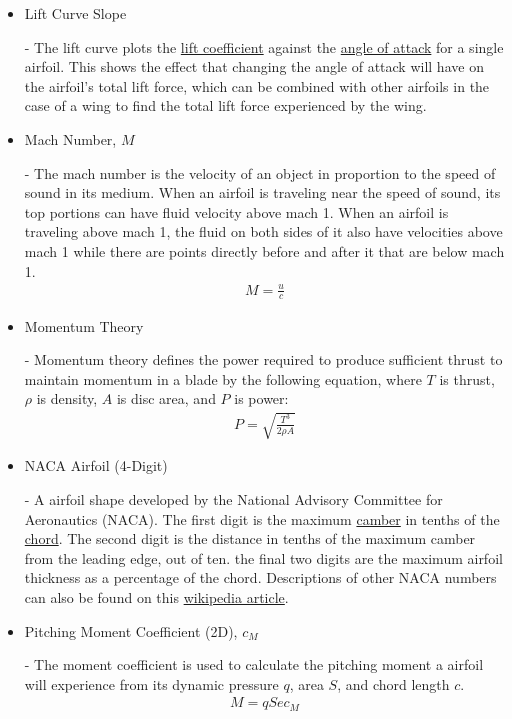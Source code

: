 \documentclass{article}
\begin{document}
\begin{itemize}
	\item \hypertarget{LC}{Lift Curve Slope} - The lift curve plots the \hyperlink{CL}{lift coefficient} against the \hyperlink{alpha}{angle of attack} for a single airfoil. This shows the effect that changing the angle of attack will have on the airfoil's total lift force, which can be combined with other airfoils in the case of a wing to find the total lift force experienced by the wing.
		
	\item \hypertarget{M}{Mach Number, $M$} - The mach number is the velocity of an object in proportion to the speed of sound in its medium. When an airfoil is traveling near the speed of sound, its top portions can have fluid velocity above mach 1. When an airfoil is traveling above mach 1, the fluid on both sides of it also have velocities above mach 1 while there are points directly before and after it that are below mach 1.
		\begin{equation} \label{eq:15}
		\begin{aligned}
        			M = \frac{u}{c}
	    	\end{aligned}
		\end{equation}
	
	\item \hypertarget{MT}{Momentum Theory} - Momentum theory defines the power required to produce sufficient thrust to maintain momentum in a blade by the following equation, where $T$ is thrust, $\rho$ is density, $A$ is disc area, and $P$ is power:
	\begin{equation}
	\begin{aligned}
        		P = \sqrt{\frac{T^{3}}{2 \rho A}}
	\end{aligned}
	\end{equation}
		
	\item \hypertarget{NACA}{NACA Airfoil (4-Digit)} - A airfoil shape developed by the National Advisory Committee for Aeronautics (NACA). The first digit is the maximum \hyperlink{Camber}{camber} in tenths of the \hyperlink{c}{chord}. The second digit is the distance in tenths of the maximum camber from the leading edge, out of ten. the final two digits are the maximum airfoil thickness as a percentage of the chord. Descriptions of other NACA numbers can also be found on this \href{https://en.wikipedia.org/wiki/NACA_airfoil}{wikipedia article}. 
		
	\item \hypertarget{CM}{Pitching Moment Coefficient (2D), $c_{M}$} - The moment coefficient is used to calculate the pitching moment a airfoil will experience from its dynamic pressure $q$, area $S$, and chord length $c$.
		\begin{equation} \label{eq:16}
		\begin{aligned}
        			M = q S e c_{M}
	    	\end{aligned}
		\end{equation}
	

\end{itemize}
\end{document}
